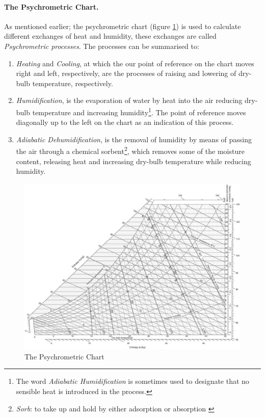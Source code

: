 \paragraph{The Psychrometric Chart.}As mentioned earlier; the psychrometric chart
(figure \ref{PsychroChart}) is used to calculate different exchanges of heat and
humidity, these exchanges are called \emph{Psychrometric processes}. The processes can be summarised to:
\begin{enumerate}
  \item \emph{Heating} and \emph{Cooling}, at which the our point of reference on the chart moves
  right and left, respectively, are the processes of raising and lowering of dry-bulb temperature,
  respectively.
  \item \emph{Humidification}, is the evaporation of water by heat into the air reducing dry-bulb
  temperature and increasing humidity\footnote{The word \emph{Adiabatic Humidification} is sometimes
  used to designate that no sensible heat is introduced in the process.}. The point of reference
  moves diagonally up to the left on the chart as an indication of this process.
  \item \emph{Adiabatic Dehumidification}, is the removal of humidity by means of passing the air
  through a chemical sorbent\footnote{\emph{Sorb}: to take up and hold by either adsorption or
  absorption \cite{merriam03}}, which removes some of the moisture content, releasing heat and
  increasing dry-bulb temperature while reducing humidity.
\end{enumerate}

\begin{figure}[htbp] %
\centering
\includegraphics[width=17cm,angle=90]{./Images/1-PsychrometricChart}
\caption[The Psychrometiric Chart]{The Psychrometric Chart \cite{szokolay08} \label{PsychroChart}}
\end{figure}

